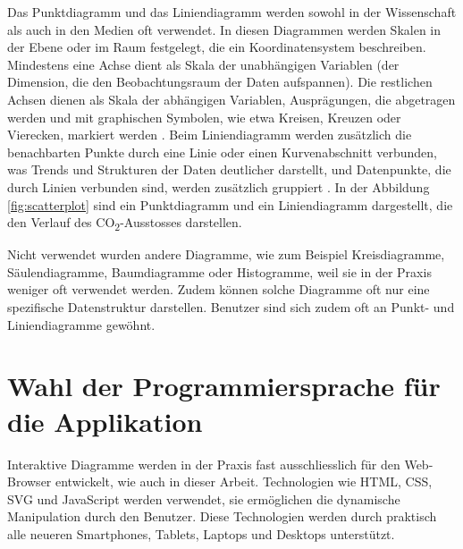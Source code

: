 Das Punktdiagramm und das Liniendiagramm werden sowohl in der Wissenschaft als auch in den Medien oft verwendet. In diesen Diagrammen werden Skalen in der Ebene oder im Raum festgelegt, die ein Koordinatensystem beschreiben. Mindestens eine Achse dient als Skala der unabhängigen Variablen (der Dimension, die den Beobachtungsraum der Daten aufspannen). Die restlichen Achsen dienen als Skala der abhängigen Variablen, Ausprägungen, die abgetragen werden und mit graphischen Symbolen, wie etwa Kreisen, Kreuzen oder Vierecken, markiert werden \cite{viz}. Beim Liniendiagramm werden zusätzlich die benachbarten Punkte durch eine Linie oder einen Kurvenabschnitt verbunden, was Trends und Strukturen der Daten deutlicher darstellt, und Datenpunkte, die durch Linien verbunden sind, werden zusätzlich gruppiert \cite{viz}. In der Abbildung \ref{fig:scatterplot} sind ein Punktdiagramm und ein Liniendiagramm dargestellt, die den Verlauf des CO\textsubscript{2}-Ausstosses darstellen.

Nicht verwendet wurden andere Diagramme, wie zum Beispiel Kreisdiagramme, Säulendiagramme, Baumdiagramme oder Histogramme, weil sie in der Praxis weniger oft verwendet werden. Zudem können solche Diagramme oft nur eine spezifische Datenstruktur darstellen. Benutzer sind sich zudem oft an Punkt- und Liniendiagramme gewöhnt.

\section{Wahl der Programmiersprache für die Applikation}

Interaktive Diagramme werden in der Praxis fast ausschliesslich für den Web-Browser entwickelt, wie auch in dieser Arbeit. Technologien wie HTML, CSS, SVG und JavaScript werden verwendet, sie ermöglichen die dynamische Manipulation durch den Benutzer. Diese Technologien werden durch praktisch alle neueren Smartphones, Tablets, Laptops und Desktops unterstützt.
